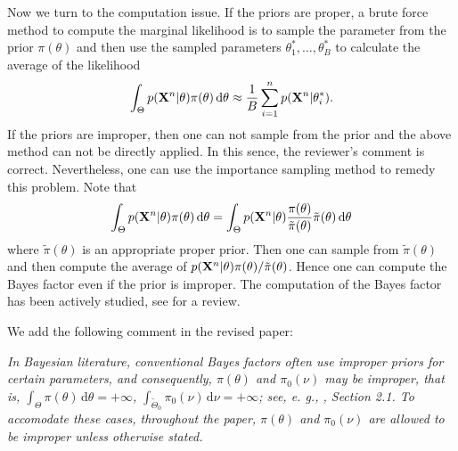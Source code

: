 \documentclass[11pt]{article}
\theoremstyle{plain}
\theoremstyle{definition}
\theoremstyle{remark}
\begin{document}
Now we turn to the computation issue.
If the priors are proper, a brute force method to compute the marginal likelihood is to sample the parameter from the prior $\pi(\theta)$ and then use the sampled parameters $\theta_1^*, \dots, \theta_B^*$ to calculate the average of the likelihood 
\begin{align*}
\int_{\Theta} p(\mathbf{X}^n | \theta) \pi(\theta)\, \mathrm d \theta
\approx
\frac{1}{B} 
\sum_{i=1}^n
p(\mathbf{X}^n | \theta_i^*)
.
\end{align*}
If the priors are improper, then one can not sample from the prior and the above method can not be directly applied.
In this sence, the reviewer's comment is correct.
Nevertheless, one can use the importance sampling method to remedy this problem.
Note that
\begin{align*}
\int_{\Theta} p(\mathbf{X}^n | \theta) \pi(\theta)\, \mathrm d \theta
=
\int_{\Theta} p(\mathbf{X}^n | \theta) \frac{\pi(\theta)}{\tilde \pi(\theta)}  \tilde \pi(\theta)  \, \mathrm d \theta
\end{align*}
where $\tilde \pi(\theta)$ is an appropriate proper prior.
Then one can sample from $\tilde \pi(\theta)$ and then compute the average of $p(\mathbf{X}^n | \theta) {\pi(\theta)}/{\tilde \pi(\theta)}$.
Hence one can compute the Bayes factor even if the prior is improper.
The computation of the Bayes factor has been actively studied, see \cite{Friel2012} for a review.

We add the following comment in the revised paper:

\begin{adjustwidth}{1.5em}{1.5em}
    \emph{
In Bayesian literature, conventional Bayes factors often use improper priors for certain parameters, and
consequently, $\pi(\theta)$ and $\pi_0 (\nu)$ may be improper, that is, $\int_{\Theta} \pi(\theta) \,
\mathrm d \theta = + \infty$, $\int_{\tilde \Theta_0} \pi_0 (\nu) \, \mathrm d \nu  = + \infty$; see, e.
g., \cite{berger2001Obj}, Section 2.1.
To accomodate these cases, throughout the paper, $\pi(\theta)$ and $\pi_0(\nu)$ are allowed to be improper unless otherwise stated.
}
\end{adjustwidth}

\end{document}
